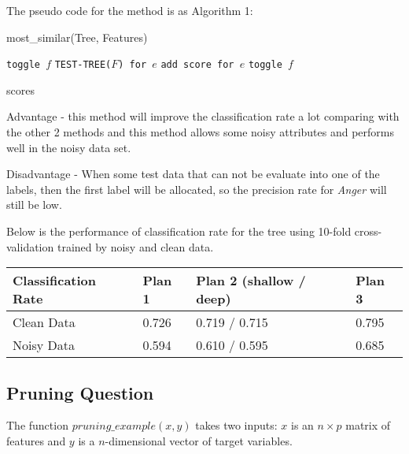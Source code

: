 \documentclass[12pt, a4paper]{article}
\begin{document}
The pseudo code for the method is as Algorithm 1:\\
\begin{algorithm}
\caption{most\_similar(Tree, Features)}\label{euclid}
\begin{algorithmic}[1]
        \State \texttt{toggle $f$}
        \State \texttt{TEST-TREE($F$) for $e$}
        \State \texttt{add score for $e$}
        \EndFor
		\State \texttt{toggle $f$}

\EndFor
\Return scores
\EndFunction
\label{code3}
\end{algorithmic}
\end{algorithm}
\newpage
Advantage - this method will improve the classification rate a lot comparing with the other 2 methods and this method allows some noisy attributes and performs well in the noisy data set.\par
Disadvantage - When some test data that can not be evaluate into one of the labels, then the first label will be allocated, so the precision rate for \textit{Anger} will still be low.\par
\bigskip

Below is the performance of classification rate for the tree using 10-fold cross-validation trained by noisy and clean data.
\begin{center}
\begin{tabular} { C{4cm} | C{1.5cm} C{3.2cm} C{1.5cm} }
    Classification Rate & Plan 1 & Plan 2 \newline (shallow / deep) & Plan 3 \\ \hline
    Clean Data & 0.726 & 0.719 / 0.715 & 0.795 \\
    Noisy Data & 0.594 & 0.610 / 0.595 & 0.685  \\
\end{tabular}
\label{table}
\end{center}

\subsection*{Pruning Question}
The function $pruning\_example(x, y)$ takes two inputs: $x$ is an $n \times p$ matrix of features and $y$ is a $n$-dimensional vector of target variables.\par
\end{document}
